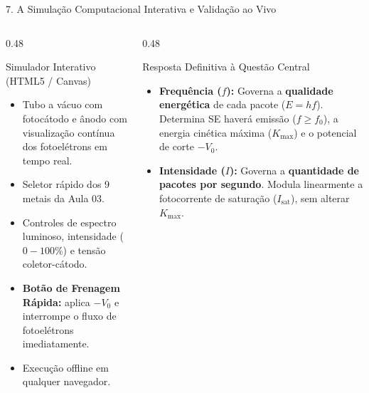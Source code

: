\documentclass[aspectratio=169, 10pt]{beamer}
\begin{document}
\begin{frame}{7. A Simulação Computacional Interativa e Validação ao Vivo}
  \begin{columns}[T]
    \begin{column}{0.48\textwidth}
      \begin{block}{Simulador Interativo (HTML5 / Canvas)}
        \footnotesize
        \begin{itemize}
          \item Tubo a vácuo com fotocátodo e ânodo com visualização contínua dos fotoelétrons em tempo real.
          \item Seletor rápido dos 9 metais da Aula 03.
          \item Controles de espectro luminoso, intensidade ($0-100\%$) e tensão coletor-cátodo.
          \item \textbf{Botão de Frenagem Rápida:} aplica $-V_0$ e interrompe o fluxo de fotoelétrons imediatamente.
          \item Execução offline em qualquer navegador.
        \end{itemize}
      \end{block}
    \end{column}

    \begin{column}{0.48\textwidth}
      \begin{exampleblock}{Resposta Definitiva à Questão Central}
        \footnotesize
        \begin{itemize}
          \item \textbf{Frequência ($f$):} Governa a \textbf{qualidade energética} de cada pacote ($E = hf$). Determina SE haverá emissão ($f \ge f_0$), a energia cinética máxima ($K_{\max}$) e o potencial de corte $-V_0$.
          \item \textbf{Intensidade ($I$):} Governa a \textbf{quantidade de pacotes por segundo}. Modula linearmente a fotocorrente de saturação ($I_{\text{sat}}$), sem alterar $K_{\max}$.
        \end{itemize}
      \end{exampleblock}
    \end{column}
  \end{columns}
\end{frame}
\end{document}
